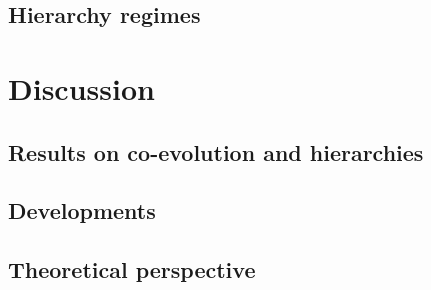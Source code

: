 \documentclass[english,fleqn,allpages]{ISTE_science}[2018/07/30]
\begin{document}
\subsection{Hierarchy regimes}








\section{Discussion}



\subsection{Results on co-evolution and hierarchies}





\subsection{Developments}



\subsection{Theoretical perspective}


\end{document}
